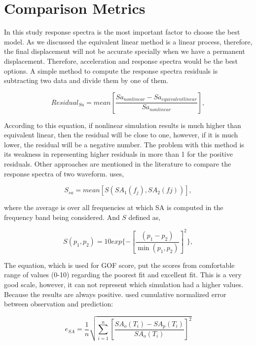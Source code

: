 \section{Comparison Metrics}

In this study response spectra is the most important factor to choose the best model. As we discussed the equivalent linear method is a linear process, therefore, the final displacement will not be accurate specially when we have a permanent displacement. Therefore, acceleration and response spectra would be the best options. A simple method to compute the response spectra residuals is subtracting two data and divide them by one of them. 


\begin{equation}
Residual_{Sa} = mean[\frac{Sa_{nonlinear} - Sa_{equivalent linear}}{Sa_{nonlinear}}],
\end{equation}

According to this equation, if nonlinear simulation results is much higher than equivalent linear, then the residual will be close to one, however, if it is much lower, the residual will be a negative number. The problem with this method is its weakness in representing higher residuals in more than 1 for the positive residuals.  Other approaches are mentioned in the literature to compare the response spectra of two waveform. \citet{Anderson_2004_Proc} uses,

\begin{equation}
S_{sa} = mean[S(SA_1(f_j),SA_2(fj))],
\end{equation}

where the average is over all frequencies at which SA is computed in the frequency band being considered. And $S $ defined as,

\begin{equation}
	S( p_1, p_2) = 10 exp \{ - [ \frac{(p_1 - p_2)}{ \min( p_1, p_2 ) }]^2 \},
\end{equation}

The equation, which is used for GOF score, put the scores from comfortable range of values (0-10) regarding the poorest fit and excellent fit. This is a very good scale, however, it can not represent which simulation had a higher values. Because the results are always positive.  \citet{Assimaki2008quantifying} used cumulative normalized error between observation and prediction:

\begin{equation}
e_{SA}=\frac{1}{n}\sqrt{\sum_{i=1}^{n}[\frac{SA_o(T_i)-SA_p(T_i)}{SA_o(T_i)}]^2}
\end{equation}

